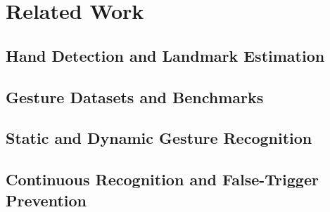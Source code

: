 \section{Related Work}


\subsection{Hand Detection and Landmark Estimation}

\subsection{Gesture Datasets and Benchmarks}

\subsection{Static and Dynamic Gesture Recognition}

\subsection{Continuous Recognition and False-Trigger Prevention}

